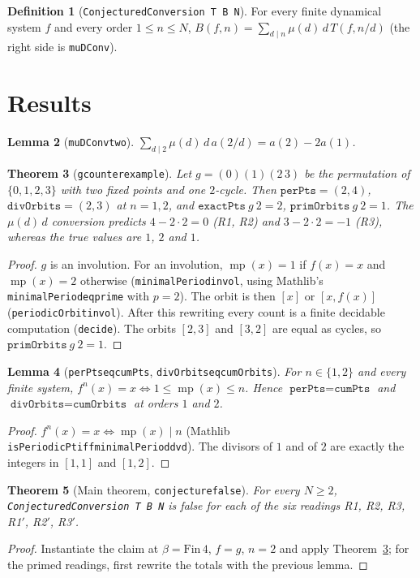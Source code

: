 \documentclass[11pt]{article}
\newtheorem{theorem}{Theorem}
\newtheorem{lemma}[theorem]{Lemma}
\theoremstyle{definition}
\newtheorem{definition}[theorem]{Definition}
\theoremstyle{remark}
\renewcommand{\_}{\oldus\allowbreak}
\newcommand{\mper}{\operatorname{mp}}
\begin{document}
\begin{definition}[\texttt{ConjecturedConversion T B N}]
For every finite dynamical system $f$ and every order $1\le n\le N$,
$B(f,n)=\sum_{d\mid n}\mu(d)\,d\,T(f,n/d)$ (the right side is \texttt{muDConv}).
\end{definition}

\section{Results}

\begin{lemma}[\texttt{muDConv\_two}]
$\sum_{d\mid 2}\mu(d)\,d\,a(2/d)=a(2)-2a(1)$.
\end{lemma}

\begin{theorem}[\texttt{g\_counterexample}]\label{thm:g}
Let $g=(0)(1)(2\,3)$ be the permutation of $\{0,1,2,3\}$ with two fixed points and one $2$-cycle. Then
$\texttt{perPts}=(2,4)$, $\texttt{divOrbits}=(2,3)$ at $n=1,2$, and $\texttt{exactPts}\ g\ 2=2$,
$\texttt{primOrbits}\ g\ 2=1$. The $\mu(d)\,d$ conversion predicts
$4-2\cdot2=0$ (R1, R2) and $3-2\cdot2=-1$ (R3), whereas the true values are $1$, $2$ and $1$.
\end{theorem}
\begin{proof}
$g$ is an involution. For an involution, $\mper(x)=1$ if $f(x)=x$ and $\mper(x)=2$ otherwise
(\texttt{minimalPeriod\_invol}, using Mathlib's \texttt{minimalPeriod\_eq\_prime} with $p=2$). The orbit is
then $[x]$ or $[x,f(x)]$ (\texttt{periodicOrbit\_invol}). After this rewriting every count is a finite
decidable computation (\texttt{decide}). The orbits $[2,3]$ and $[3,2]$ are equal as cycles, so
$\texttt{primOrbits}\ g\ 2=1$.
\end{proof}

\begin{lemma}[\texttt{perPts\_eq\_cumPts}, \texttt{divOrbits\_eq\_cumOrbits}]
For $n\in\{1,2\}$ and every finite system, $f^n(x)=x \iff 1\le \mper(x)\le n$. Hence
$\texttt{perPts}=\texttt{cumPts}$ and $\texttt{divOrbits}=\texttt{cumOrbits}$ at orders $1$ and $2$.
\end{lemma}
\begin{proof}
$f^n(x)=x\iff \mper(x)\mid n$ (Mathlib \texttt{isPeriodicPt\_iff\_minimalPeriod\_dvd}). The divisors of $1$
and of $2$ are exactly the integers in $[1,1]$ and $[1,2]$.
\end{proof}

\begin{theorem}[Main theorem, \texttt{conjecture\_5402\_false}]
For every $N\ge 2$, \texttt{ConjecturedConversion T B N} is false for each of the six readings
R1, R2, R3, R1$'$, R2$'$, R3$'$.
\end{theorem}
\begin{proof}
Instantiate the claim at $\beta=\mathrm{Fin}\,4$, $f=g$, $n=2$ and apply Theorem~\ref{thm:g}; for the
primed readings, first rewrite the totals with the previous lemma.
\end{proof}
\end{document}
